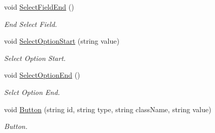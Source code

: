 \begin{DoxyCompactItemize}
void \hyperlink{classHTMLTags_adde967a90e03f4b5168b9bffd319980b}{Select\-Field\-End} ()
\begin{DoxyCompactList}\small\item\em End Select Field. \end{DoxyCompactList}\item 
void \hyperlink{classHTMLTags_a09f91c8601aed3aa2d0978123225afaa}{Select\-Option\-Start} (string value)
\begin{DoxyCompactList}\small\item\em Select Option Start. \end{DoxyCompactList}\item 
void \hyperlink{classHTMLTags_ae312980d20e3dea0469fdcb730fb975e}{Select\-Option\-End} ()
\begin{DoxyCompactList}\small\item\em Selct Option End. \end{DoxyCompactList}\item 
void \hyperlink{classHTMLTags_ab6dbb027d808e7b708a4ece7e911ceee}{Button} (string id, string type, string class\-Name, string value)
\begin{DoxyCompactList}\small\item\em Button. \end{DoxyCompactList}\end{DoxyCompactItemize}
